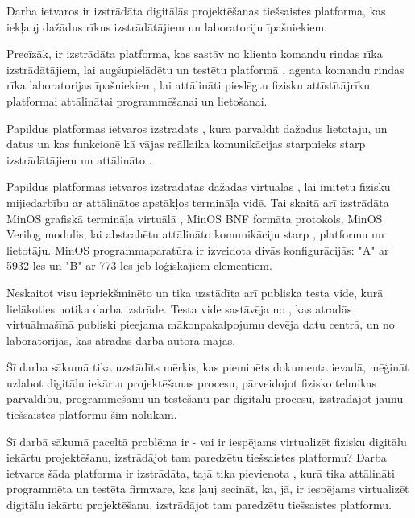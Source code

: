 Darba ietvaros ir izstrādāta digitālās  projektēšanas
tiešsaistes platforma, kas iekļauj dažādus rīkus 
izstrādātājiem un  laboratoriju īpašniekiem.
\cite{VeinbahsKrisjanisTestbed}

Precīzāk, ir izstrādāta platforma, kas sastāv no klienta komandu rindas rīka
izstrādātājiem, lai augšupielādētu un testētu platformā
, aģenta komandu rindas rīka laboratorijas
īpašniekiem, lai attālināti pieslēgtu fizisku attīstītājrīku
 platformai attālinātai programmēšanai un lietošanai.

Papildus platformas ietvaros izstrādāts , kurā
pārvaldīt dažādus lietotāju,  un
 datus un kas funkcionē kā vājas reāllaika
komunikācijas starpnieks starp izstrādātājiem un attālināto
.

Papildus platformas ietvaros izstrādātas dažādas virtuālas
, lai imitētu fizisku mijiedarbību ar
 attālinātos apstākļos termināļa vidē. Tai skaitā arī
izstrādāta MinOS grafiskā termināļa virtuālā ,
MinOS BNF formāta protokols, MinOS Verilog
 modulis, lai abstrahētu attālināto
komunikāciju starp , platformu un lietotāju. MinOS
programmaparatūra ir izveidota divās konfigurācijās: "A" ar 5932 \gls{lcs} un
"B" ar 773 \gls{lcs} jeb loģiskajiem elementiem.

Neskaitot visu iepriekšminēto  un
 tika uzstādīta arī publiska testa vide, kurā
lielākoties notika darba izstrāde. Testa vide sastāvēja no
, kas atradās virtuālmašīnā publiski pieejama
mākoņpakalpojumu devēja datu centrā, un no laboratorijas, kas atradās darba autora
mājās. \cite{VeinbahsKrisjanisProduction}

Šī darba sākumā tika uzstādīts mērķis, kas pieminēts dokumenta ievadā, mēģināt
uzlabot digitālu iekārtu projektēšanas procesu, pārveidojot fizisko tehnikas
pārvaldību, programmēšanu un testēšanu par digitālu procesu, izstrādājot jaunu
tiešsaistes platformu šim nolūkam.

Šī darbā sākumā paceltā problēma ir - vai ir iespējams virtualizēt fizisku
digitālu iekārtu projektēšanu, izstrādājot tam paredzētu tiešsaistes platformu?
Darba ietvaros šāda platforma ir izstrādāta, tajā tika pievienota
, kurā tika attālināti programmēta un testēta
\gls{firmware}, kas ļauj secināt, ka, jā, ir iespējams virtualizēt digitālu
iekārtu projektēšanu, izstrādājot tam paredzētu tiešsaistes platformu.

